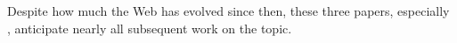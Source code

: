 \documentclass{zarticle}
\def\todo#1{{\color{todocolor}\bfseries [#1]}}
\begin{document}
Despite how much the Web has evolved since then, these three papers,
especially \citeauthor{sun2002statistical}, anticipate nearly all
subsequent work on the topic.









\end{document}
